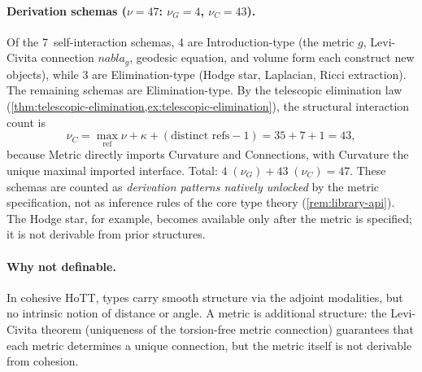 \documentclass[11pt,a4paper]{article}
\def\nabla{nabla}%
\theoremstyle{plain}
\theoremstyle{definition}
\theoremstyle{remark}
\begin{document}
\paragraph{Derivation schemas ($\nu = 47$: $\nu_G = 4$, $\nu_C = 43$).}
Of the 7~self-interaction schemas, 4 are Introduction-type (the metric $g$, Levi-Civita connection $\nabla_g$, geodesic equation, and volume form each construct new objects), while 3 are Elimination-type (Hodge star, Laplacian, Ricci extraction).
The remaining schemas are Elimination-type.
By the telescopic elimination law (\cref{thm:telescopic-elimination,ex:telescopic-elimination}), the structural interaction count is
\[
  \nu_C
  =
  \max_{\mathrm{ref}} \nu + \kappa + (\text{distinct refs} - 1)
  =
  35 + 7 + 1
  =
  43,
\]
because Metric directly imports Curvature and Connections, with Curvature the unique maximal imported interface.
Total: $4\;(\nu_G) + 43\;(\nu_C) = 47$.
These schemas are counted as \emph{derivation patterns natively unlocked} by the metric specification, not as inference rules of the core type theory (\cref{rem:library-api}).
The Hodge star, for example, becomes available only after the metric is specified; it is not derivable from prior structures.

\paragraph{Why not definable.}
In cohesive HoTT, types carry smooth structure via the adjoint modalities, but no intrinsic notion of distance or angle.
A metric is additional structure: the Levi-Civita theorem (uniqueness of the torsion-free metric connection) guarantees that each metric determines a unique connection, but the metric itself is not derivable from cohesion.
\end{document}
